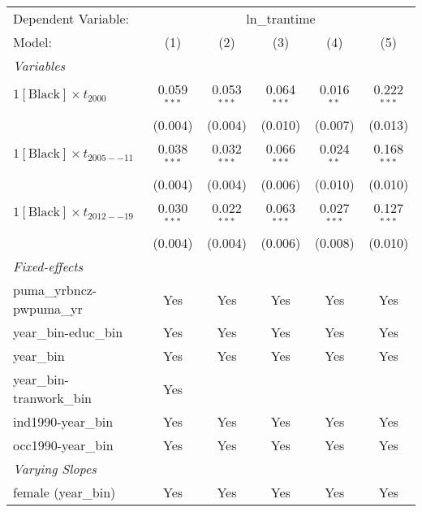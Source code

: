 
\begingroup
\centering
\begin{tabular}{lccccc}
   \tabularnewline \midrule \midrule
   Dependent Variable: & \multicolumn{5}{c}{ln\_trantime}\\
   Model:                                  & (1)           & (2)           & (3)           & (4)           & (5)\\  
   \midrule
   \emph{Variables}\\
   $1[\text{Black}] \times t_{2000}$       & 0.059$^{***}$ & 0.053$^{***}$ & 0.064$^{***}$ & 0.016$^{**}$  & 0.222$^{***}$\\   
                                           & (0.004)       & (0.004)       & (0.010)       & (0.007)       & (0.013)\\   
   $1[\text{Black}] \times t_{2005--11}$   & 0.038$^{***}$ & 0.032$^{***}$ & 0.066$^{***}$ & 0.024$^{**}$  & 0.168$^{***}$\\   
                                           & (0.004)       & (0.004)       & (0.006)       & (0.010)       & (0.010)\\   
   $1[\text{Black}] \times t_{2012--19}$   & 0.030$^{***}$ & 0.022$^{***}$ & 0.063$^{***}$ & 0.027$^{***}$ & 0.127$^{***}$\\   
                                           & (0.004)       & (0.004)       & (0.006)       & (0.008)       & (0.010)\\   
   \midrule
   \emph{Fixed-effects}\\
   puma\_yrbncz-pwpuma\_yr                 & Yes           & Yes           & Yes           & Yes           & Yes\\  
   year\_bin-educ\_bin                     & Yes           & Yes           & Yes           & Yes           & Yes\\  
   year\_bin                               & Yes           & Yes           & Yes           & Yes           & Yes\\  
   year\_bin-tranwork\_bin                 & Yes           &               &               &               & \\  
   ind1990-year\_bin                       & Yes           & Yes           & Yes           & Yes           & Yes\\  
   occ1990-year\_bin                       & Yes           & Yes           & Yes           & Yes           & Yes\\  
   \midrule
   \emph{Varying Slopes}\\
   female (year\_bin)                      & Yes           & Yes           & Yes           & Yes           & Yes\\  

\end{tabular}
